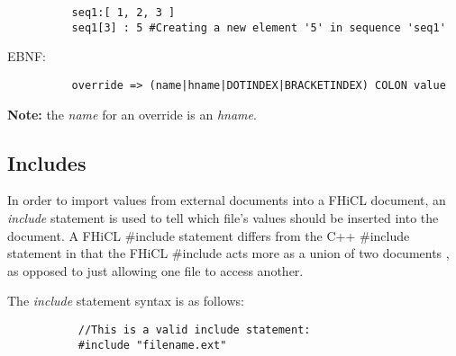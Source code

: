 \documentclass{memarticle}
\begin{document}
{\begin{verbatim}
          seq1:[ 1, 2, 3 ]
          seq1[3] : 5 #Creating a new element '5' in sequence 'seq1'
                        \end{verbatim}
                        \par
                        EBNF:
                        \begin{verbatim}
          override => (name|hname|DOTINDEX|BRACKETINDEX) COLON value
                        \end{verbatim}  
                        \textbf{ Note: } the \emph{name} for an override 
                        is an \emph{hname}.
                \newpage
                \subsection{Includes}
                        In order to import values from external documents into a FHiCL document,
                        an \emph{include} statement is used to tell which file's values should be inserted into the document.
                        A FHiCL \#include statement differs from the C++ \#include statement
                        in that the FHiCL \#include acts
                        more as a union of two documents
                        , as opposed to just allowing one file to access another.
                        \par
                        The \emph{include} statement syntax is as follows:
                        \begin{verbatim}
           //This is a valid include statement:
           #include "filename.ext"
                                

\end{verbatim}}
\end{document}

